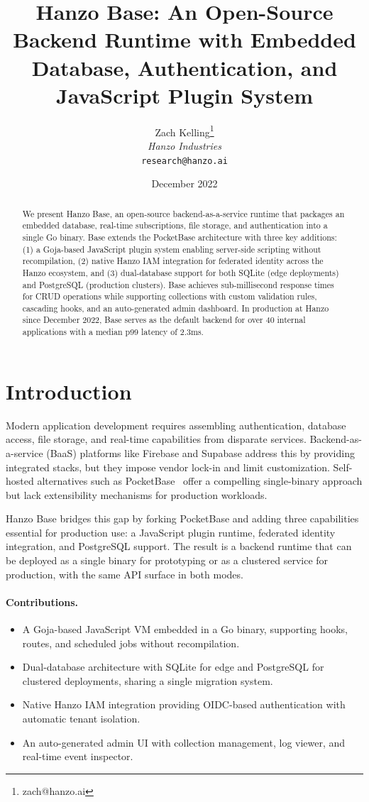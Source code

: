 \documentclass[11pt,twocolumn]{article}
\title{Hanzo Base: An Open-Source Backend Runtime with Embedded Database, Authentication, and JavaScript Plugin System}
\author{Zach Kelling\thanks{zach@hanzo.ai} \\ \textit{Hanzo Industries} \\ \texttt{research@hanzo.ai}}
\date{December 2022}
\begin{document}
\hanzocoverpage

\begin{abstract}
We present Hanzo Base, an open-source backend-as-a-service runtime that packages an embedded database, real-time subscriptions, file storage, and authentication into a single Go binary. Base extends the PocketBase architecture with three key additions: (1) a Goja-based JavaScript plugin system enabling server-side scripting without recompilation, (2) native Hanzo IAM integration for federated identity across the Hanzo ecosystem, and (3) dual-database support for both SQLite (edge deployments) and PostgreSQL (production clusters). Base achieves sub-millisecond response times for CRUD operations while supporting collections with custom validation rules, cascading hooks, and an auto-generated admin dashboard. In production at Hanzo since December 2022, Base serves as the default backend for over 40 internal applications with a median p99 latency of 2.3ms.
\end{abstract}

\section{Introduction}

Modern application development requires assembling authentication, database access, file storage, and real-time capabilities from disparate services. Backend-as-a-service (BaaS) platforms like Firebase and Supabase address this by providing integrated stacks, but they impose vendor lock-in and limit customization. Self-hosted alternatives such as PocketBase~\cite{pocketbase2022} offer a compelling single-binary approach but lack extensibility mechanisms for production workloads.

Hanzo Base bridges this gap by forking PocketBase and adding three capabilities essential for production use: a JavaScript plugin runtime, federated identity integration, and PostgreSQL support. The result is a backend runtime that can be deployed as a single binary for prototyping or as a clustered service for production, with the same API surface in both modes.

\paragraph{Contributions.}
\begin{itemize}
    \item A Goja-based JavaScript VM embedded in a Go binary, supporting hooks, routes, and scheduled jobs without recompilation.
    \item Dual-database architecture with SQLite for edge and PostgreSQL for clustered deployments, sharing a single migration system.
    \item Native Hanzo IAM integration providing OIDC-based authentication with automatic tenant isolation.
    \item An auto-generated admin UI with collection management, log viewer, and real-time event inspector.
\end{itemize}
\end{document}
